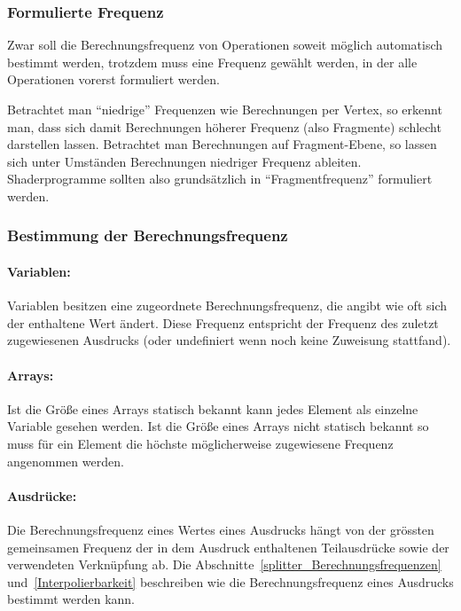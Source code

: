 \subsubsection{Formulierte Frequenz}
\label{formulierte_frequenz}

Zwar soll die Berechnungsfrequenz von Operationen soweit möglich automatisch bestimmt werden, trotzdem muss eine Frequenz
gewählt werden, in der alle Operationen vorerst formuliert werden.

Betrachtet man "`niedrige"' Frequenzen wie Berechnungen per Vertex, so erkennt man, dass sich damit Berechnungen höherer
Frequenz (also Fragmente) schlecht darstellen lassen. Betrachtet man Berechnungen auf Fragment-Ebene, so lassen sich
unter Umständen Berechnungen niedriger Frequenz ableiten.
Shaderprogramme sollten also grundsätzlich in "`Fragmentfrequenz"' formuliert werden.

\subsubsection{Bestimmung der Berechnungsfrequenz}

\paragraph{Variablen:} Variablen besitzen eine zugeordnete Berechnungsfrequenz, die angibt wie oft sich der enthaltene Wert ändert.
Diese Frequenz entspricht der Frequenz des zuletzt zugewiesenen Ausdrucks (oder undefiniert wenn noch keine Zuweisung stattfand).

\paragraph{Arrays:} Ist die Größe eines Arrays statisch bekannt kann jedes Element als einzelne Variable gesehen werden.
Ist die Größe eines Arrays nicht statisch bekannt so muss für ein Element die höchste möglicherweise zugewiesene
Frequenz angenommen werden.

\paragraph{Ausdrücke:} Die Berechnungsfrequenz eines Wertes eines Ausdrucks hängt von der grössten gemeinsamen Frequenz
der in dem Ausdruck enthaltenen Teilausdrücke sowie der verwendeten Verknüpfung ab.
Die Abschnitte~\ref{splitter_Berechnungsfrequenzen} und~\ref{Interpolierbarkeit} beschreiben wie die Berechnungsfrequenz eines Ausdrucks bestimmt werden kann.

